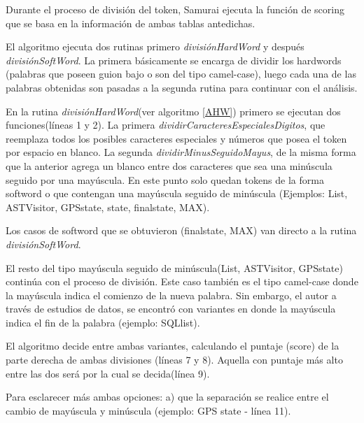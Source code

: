 \documentclass[a4paper,12pt]{report}
\begin{document}
Durante el proceso de división del token, Samurai ejecuta la función de scoring que se basa en la información de ambas tablas antedichas.


El algoritmo ejecuta dos rutinas primero \textit{divisiónHardWord} y después \mbox{\textit{divisiónSoftWord}}. La primera básicamente se encarga de dividir los hardwords (palabras que poseen guion bajo o son del tipo camel-case), luego cada una de las palabras obtenidas son pasadas a la segunda rutina para continuar con el análisis.

En la rutina \textit{divisiónHardWord}(ver algoritmo \ref{AHW}) primero se ejecutan dos funciones(líneas 1 y 2). La primera \textit{dividirCaracteresEspecialesDigitos}, que reemplaza todos los posibles caracteres especiales y números que posea el token por espacio en blanco. La segunda \mbox{\textit{dividirMinusSeguidoMayus}}, de la misma forma que la anterior agrega un blanco entre dos caracteres que sea una minúscula seguido por una mayúscula. En este punto solo quedan tokens de la forma softword o que contengan una mayúscula seguido de minúscula (Ejemplos: \textsf{List, ASTVisitor, GPSstate, state, finalstate, MAX}).

Los casos de softword que se obtuvieron (\textsf{finalstate}, \textsf{MAX}) van directo a la rutina \mbox{\textit{divisiónSoftWord}}. 

El resto del tipo mayúscula seguido de minúscula(\textsf{List, ASTVisitor, GPSstate}) continúa con el proceso de división. Este caso también es el tipo \mbox{camel-case} donde la mayúscula indica el comienzo de la nueva palabra. Sin embargo, el autor a través de estudios de datos, se encontró con variantes en donde la mayúscula indica el fin de la palabra (ejemplo: \textsf{SQLlist}).
 
El algoritmo decide entre ambas variantes, calculando el puntaje (score) de la parte derecha de ambas divisiones (líneas 7 y 8). Aquella con puntaje más alto entre las dos será por la cual se decida(línea 9). 

Para esclarecer más ambas opciones: a) que la separación se realice entre el cambio de mayúscula y minúscula (ejemplo: \textsf{GPS state} - línea 11).
\end{document}
